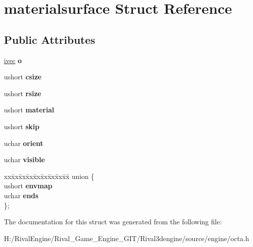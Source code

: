 \hypertarget{structmaterialsurface}{}\section{materialsurface Struct Reference}
\label{structmaterialsurface}
\subsection*{Public Attributes}
\begin{DoxyCompactItemize}
\item 
\mbox{\label{structmaterialsurface_a65b2207d140192dc389d8f547f6fe5e3}} 
\hyperlink{structivec}{ivec} {\bfseries o}
\item 
\mbox{\label{structmaterialsurface_ad4e5394d3fcd3c198bec2b3f1824d110}} 
ushort {\bfseries csize}
\item 
\mbox{\label{structmaterialsurface_acad09b10ff03532d4742ed4991585c41}} 
ushort {\bfseries rsize}
\item 
\mbox{\label{structmaterialsurface_ad1f031f0cd4746a1a2057282bc940a6d}} 
ushort {\bfseries material}
\item 
\mbox{\label{structmaterialsurface_a869c27df763262b9e4283e5ee26e23e2}} 
ushort {\bfseries skip}
\item 
\mbox{\label{structmaterialsurface_a70498d27bbe3515addb50c95a60c59a2}} 
uchar {\bfseries orient}
\item 
\mbox{\label{structmaterialsurface_a8ee8b16498224c90c28c670cc4f4c122}} 
uchar {\bfseries visible}
\item 
\mbox{\label{structmaterialsurface_a3218cc6c8f327857bf80f0e462d8a1c9}} 
\begin{tabbing}
xx\=xx\=xx\=xx\=xx\=xx\=xx\=xx\=xx\=\kill
union \{\\
\>ushort {\bfseries envmap}\\
\>uchar {\bfseries ends}\\
\}; \\

\end{tabbing}\end{DoxyCompactItemize}


The documentation for this struct was generated from the following file\+:\begin{DoxyCompactItemize}
\item 
H\+:/\+Rival\+Engine/\+Rival\+\_\+\+Game\+\_\+\+Engine\+\_\+\+G\+I\+T/\+Rival3dengine/source/engine/octa.\+h\end{DoxyCompactItemize}
